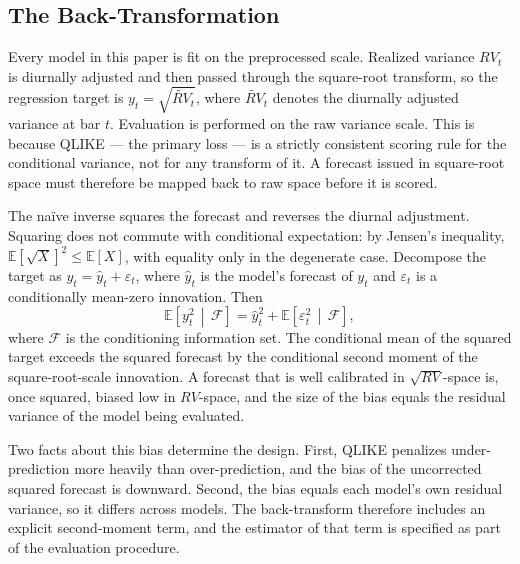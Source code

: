 \subsection{The Back-Transformation}
\label{sec:smearing_bias}

Every model in this paper is fit on the preprocessed scale. Realized variance
$RV_t$ is diurnally adjusted and then passed through the square-root
transform, so the regression target is $y_t = \sqrt{\widetilde{RV}_t}$, where
$\widetilde{RV}_t$ denotes the diurnally adjusted variance at bar $t$.
Evaluation is performed on the raw variance scale. This is because QLIKE ---
the primary loss --- is a strictly consistent scoring rule for the
conditional variance, not for any transform of it. A forecast issued in
square-root space must therefore be mapped back to raw space before it is
scored.

The na\"ive inverse squares the forecast and reverses the diurnal
adjustment. Squaring does not commute with conditional expectation: by
Jensen's inequality, $\mathbb{E}[\sqrt{X}]^2 \le \mathbb{E}[X]$, with
equality only in the degenerate case. Decompose the target as
$y_{t} = \hat{y}_{t} + \varepsilon_{t}$, where $\hat{y}_t$ is the model's
forecast of $y_t$ and $\varepsilon_t$ is a conditionally mean-zero
innovation. Then
\begin{equation}
    \mathbb{E}\!\left[y_t^2 \,\middle|\, \mathcal{F}\right]
    = \hat{y}_t^2 + \mathbb{E}\!\left[\varepsilon_t^2 \,\middle|\, \mathcal{F}\right],
    \label{eq:second_moment}
\end{equation}
where $\mathcal{F}$ is the conditioning information set. The conditional mean
of the squared target exceeds the squared forecast by the conditional second
moment of the square-root-scale innovation. A forecast that is well
calibrated in $\sqrt{RV}$-space is, once squared, biased low in $RV$-space,
and the size of the bias equals the residual variance of the model being
evaluated.

Two facts about this bias determine the design. First, QLIKE penalizes
under-prediction more heavily than over-prediction, and the bias of the
uncorrected squared forecast is downward. Second, the bias equals each
model's own residual variance, so it differs across models. The
back-transform therefore includes an explicit second-moment term, and the
estimator of that term is specified as part of the evaluation procedure.

\label{sec:smearing_estimator}
\label{sec:smearing}

